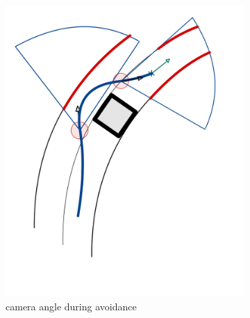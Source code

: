 \begin{figure}
\begin{subfigure}{.24\linewidth}
		\includegraphics[width=\textwidth]{Pictures/road detection blind}
		\caption{camera angle during avoidance}
	\end{subfigure}
	\begin{subfigure}{.24\linewidth}

\end{subfigure}
\end{figure}
